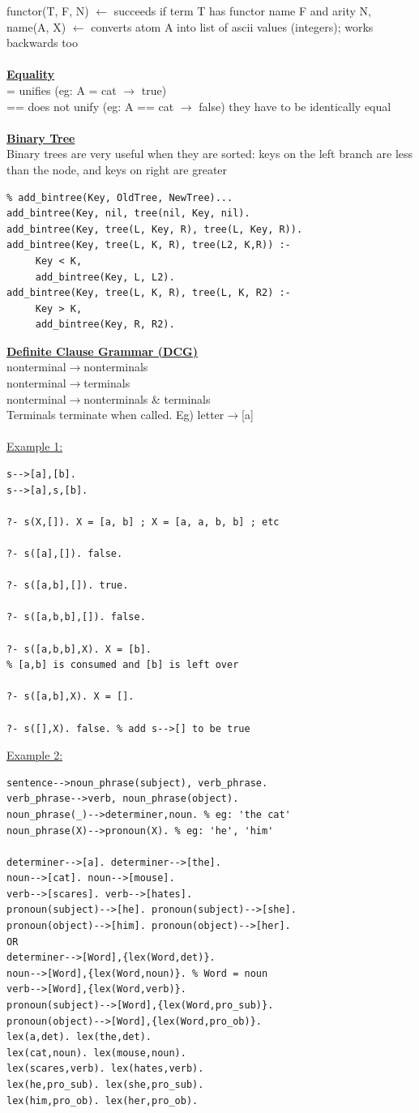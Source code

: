 \documentclass[8pt,letterpaper,twocolumn]{article}
\begin{document}
functor(T, F, N) $\leftarrow$ succeeds if term T has functor name F and arity N,\\
name(A, X) $\leftarrow$ converts atom A into list of ascii values (integers); works backwards too\\
\\
\underline{\textbf{Equality}}\\
= unifies (eg: A = cat $\rightarrow$ true)\\
== does not unify (eg: A == cat $\rightarrow$ false) they have to be identically equal\\
\\
\underline{\textbf{Binary Tree}}\\
Binary trees are very useful when they are sorted: keys on the left
branch are less than the node, and keys on right are greater
\begin{verbatim}
% add_bintree(Key, OldTree, NewTree)...
add_bintree(Key, nil, tree(nil, Key, nil).
add_bintree(Key, tree(L, Key, R), tree(L, Key, R)).
add_bintree(Key, tree(L, K, R), tree(L2, K,R)) :-
     Key < K,
     add_bintree(Key, L, L2).
add_bintree(Key, tree(L, K, R), tree(L, K, R2) :-
     Key > K,
     add_bintree(Key, R, R2).
\end{verbatim}
\underline{\textbf{Definite Clause Grammar (DCG)}}\\
nonterminal$\rightarrow$nonterminals\\
nonterminal$\rightarrow$terminals\\
nonterminal$\rightarrow$nonterminals \& terminals\\
Terminals terminate when called. Eg) letter$\rightarrow$[a]\\
\\
\underline{Example 1:}
\begin{verbatim}
s-->[a],[b].
s-->[a],s,[b].

?- s(X,[]). X = [a, b] ; X = [a, a, b, b] ; etc

?- s([a],[]). false.

?- s([a,b],[]). true.

?- s([a,b,b],[]). false.

?- s([a,b,b],X). X = [b].
% [a,b] is consumed and [b] is left over

?- s([a,b],X). X = [].

?- s([],X). false. % add s-->[] to be true
\end{verbatim}
\underline{Example 2:}
\begin{verbatim}
sentence-->noun_phrase(subject), verb_phrase.
verb_phrase-->verb, noun_phrase(object).
noun_phrase(_)-->determiner,noun. % eg: 'the cat'
noun_phrase(X)-->pronoun(X). % eg: 'he', 'him'

determiner-->[a]. determiner-->[the].
noun-->[cat]. noun-->[mouse].
verb-->[scares]. verb-->[hates].
pronoun(subject)-->[he]. pronoun(subject)-->[she].
pronoun(object)-->[him]. pronoun(object)-->[her].
OR
determiner-->[Word],{lex(Word,det)}.
noun-->[Word],{lex(Word,noun)}. % Word = noun
verb-->[Word],{lex(Word,verb)}.
pronoun(subject)-->[Word],{lex(Word,pro_sub)}.
pronoun(object)-->[Word],{lex(Word,pro_ob)}.
lex(a,det). lex(the,det).
lex(cat,noun). lex(mouse,noun).
lex(scares,verb). lex(hates,verb).
lex(he,pro_sub). lex(she,pro_sub).
lex(him,pro_ob). lex(her,pro_ob).
\end{verbatim}
\end{document}
